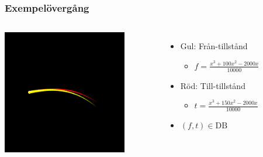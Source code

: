 \documentclass[]{beamer}
\renewcommand{\oe}{\"{o}}
\begin{document}
\begin{frame}
  \frametitle{Exempel\oe verg\aa ng}
  \begin{columns}[c]
    \column{2in}
    \includegraphics[width=0.8\textwidth]{transition-example.png}
    
    \column{2in}
    \begin{itemize}
    \item Gul: Fr\aa n-tillst\aa nd
      \begin{itemize}
      \item $f = \frac{x^3 + 100x^2 - 2000x}{10000}$
      \end{itemize}
      
    \item R\oe d: Till-tillst\aa nd
      \begin{itemize}
      \item $t = \frac{x^3 + 150x^2 - 2000x}{10000}$
      \end{itemize}
    \item $\left(f, t\right) \in \mathrm{DB}$
    \end{itemize}
  \end{columns}
\end{frame}
\end{document}
